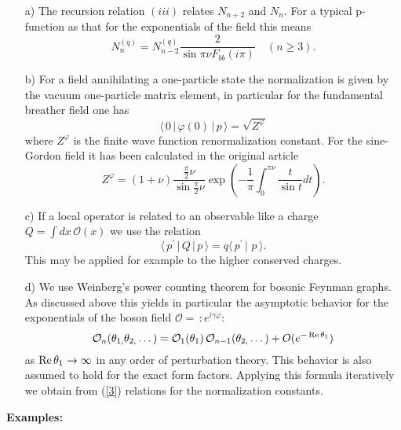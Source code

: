 \documentclass[a4paper,12pt]{article}
\def\func#1{\mathop{\rm #1}}%
\begin{document}
\begin{enumerate}
\item[a)]  The recursion relation $(iii)$ relates $N_{n+2}$ and $N_{n}.$ For
a typical p-function as that for the exponentials of the field this means 
\begin{equation}
N_{n}^{(q)}=N_{n-2}^{(q)}\frac{2}{\sin \pi \nu F_{bb}(i\pi )}\quad (n\geq 3).
\label{N}
\end{equation}

\item[b)]  For a field annihilating a one-particle state the normalization
is given by the vacuum one-particle matrix element, in particular for the
fundamental breather field one has 
\[
\langle \,0\,|\,\varphi (0)\,|\,p\,\rangle =\sqrt{Z^{\varphi }} 
\]
where $Z^{\varphi }$ is the finite wave function renormalization constant.
For the sine-Gordon field it has been calculated in the original article \cite
{KW} 
\[
Z^{\varphi }=(1+\nu )\frac{\frac{\pi }{2}\nu }{\sin \frac{\pi }{2}\nu }\exp
\left( -\frac{1}{\pi }\int_{0}^{\pi \nu }\frac{t}{\sin t}dt\right) . 
\]

\item[c)]  If a local operator is related to an observable like a charge $%
Q=\int dx\,\mathcal{O}(x)$ we use the relation 
\[
\langle \,p^{\prime }\,|\,Q\,|\,p\,\rangle =q\langle \,p^{\prime
}\,|\,\,p\,\rangle . 
\]
This may be applied for example to the higher conserved charges.

\item[d)]  We use Weinberg's power counting theorem for bosonic Feynman
graphs. As discussed above this yields in particular the asymptotic behavior
for the exponentials of the boson field $\mathcal{O}=\,:\!e^{i\gamma \varphi
}\!:$ 
\[
\mathcal{O}_{n}(\theta _{1,}\theta _{2,}\dots )=\mathcal{O}_{1}(\theta
_{1})\,\mathcal{O}_{n-1}(\theta _{2,}\dots )+O(e^{-\func{Re}\theta _{1}}) 
\]
as $\func{Re}\theta _{1}\rightarrow \infty $ in any order of perturbation
theory. This behavior is also assumed to hold for the exact form factors.
Applying this formula iteratively we obtain from (\ref{3}) relations for the
normalization constants.
\end{enumerate}

\noindent \textbf{Examples: }
\end{document}
